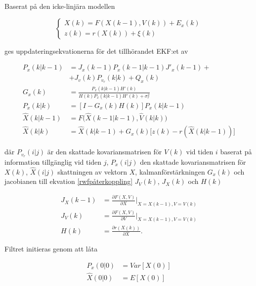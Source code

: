 \documentclass[11pt]{article}
\begin{document}
\begin{flushleft}
Baserat på den icke-linjära modellen 

\begin{equation}
	\begin{cases}
	X(k) = F(X(k-1),V(k)) + E_x(k) \\
	z(k) = r(X(k)) + \xi(k)
	\end{cases}
\end{equation}

ges uppdateringsekvationerna för det tillhörandet EKF:et av

\begin{equation*}
	\begin{aligned}
	P_x(k|k-1) &= J_x(k-1) P_x(k-1|k-1)J'_x(k-1) + \\
	&+ J_v(k)P_{v_r}(k|k) + Q_x(k) \\
	G_x(k) &= \frac {P_x(k | k-1) H'(k)} {H(k)P_x(k|k-1)H'(k) + \sigma_r^2} \\
	P_x(k|k) &= [I - G_x(k)H(k)] P_x(k |  k - 1) \\
	\hat{X}(k|k-1) &= F \Big(\hat{X}(k-1 | k-1), \hat{V}(k | k) \Big) \\
	\hat{X}(k | k) &= \hat{X}(k | k - 1) + G_x(k) \Big[ z(k) - r(\hat{X}(k | k -1)) \Big] 
	\end{aligned}
\end{equation*}

där $P_{v_r}(i|j)$ är den skattade kovariansmatrisen för $V(k)$ vid tiden $i$ baserat på information tillgänglig vid tiden $j$, $P_x(i|j)$ den skattade kovariansmatrisen för $X(k)$, $\hat{X}(i|j)$ skattningen av vektorn $X$, kalmanförstärkningen $G_x(k)$ och jacobianen till ekvation \eqref{rwfpåterkoppling} $J_V(k)$, $J_X(k)$ och $H(k)$

\begin{equation*}
	\begin{aligned}
	J_X(k-1) &= \frac {\partial F(X,V)} {\partial X} \Big|_{X=X(k-1),V=V(k)} \\
	J_V(k) &=  \frac {\partial F(X,V)} {\partial V} \Big|_{X=X(k-1),V=V(k)} \\
	H(k) &=  \frac {\partial r (X(k))} {\partial X}.
	\end{aligned}
\end{equation*}

Filtret initieras genom att låta 

\begin{equation*}
	\begin{aligned}
	P_x(0|0) &= Var [X(0)] \\
	\hat{X}(0|0) &= E[X(0)]
	\end{aligned}
\end{equation*}


\end{flushleft}
\end{document}
